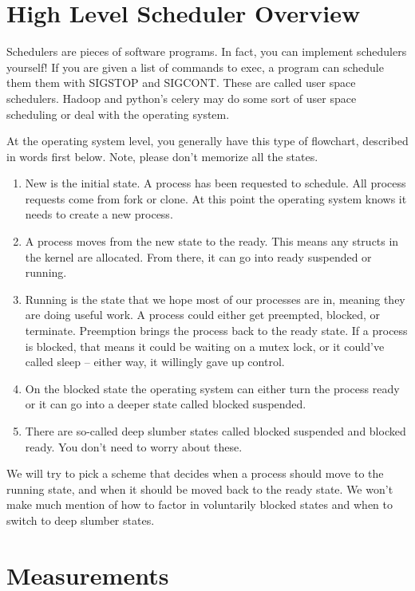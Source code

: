 \section{High Level Scheduler Overview}

Schedulers are pieces of software programs. In fact, you can implement schedulers yourself!
If you are given a list of commands to exec, a program can schedule them them with SIGSTOP and SIGCONT.
These are called user space schedulers.
Hadoop and python's celery may do some sort of user space scheduling or deal with the operating system.

At the operating system level, you generally have this type of flowchart, described in words first below.
Note, please don't memorize all the states.

\begin{enumerate}
\item New is the initial state. A process has been requested to schedule. All process requests come from fork or clone. At this point the operating system knows it needs to create a new process.
\item A process moves from the new state to the ready. This means any structs in the kernel are allocated. From there, it can go into ready suspended or running.
\item Running is the state that we hope most of our processes are in, meaning they are doing useful work. A process could either get preempted, blocked, or terminate. Preemption brings the process back to the ready state. If a process is blocked, that means it could be waiting on a mutex lock, or it could've called sleep -- either way, it willingly gave up control.
\item On the blocked state the operating system can either turn the process ready or it can go into a deeper state called blocked suspended.
\item There are so-called deep slumber states called blocked suspended and blocked ready. You don't need to worry about these.
\end{enumerate}

We will try to pick a scheme that decides when a process should move to the running state, and when it should be moved back to the ready state.
We won't make much mention of how to factor in voluntarily blocked states and when to switch to deep slumber states.

\section{Measurements}

